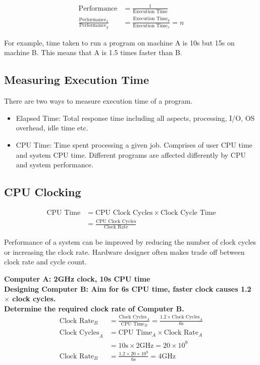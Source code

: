 \begin{align*}
    \mbox{Performance} &= \frac{1}{\mbox{Execution Time}} \\
    \frac{\mbox{Performance}_x}{\mbox{Performance}_y} &= \frac{\mbox{Execution Time}_y}{\mbox{Execution Time}_x} = n
    \label{eqn:performance}
\end{align*}

For example, time taken to run a program on machine A is 10s but 15s on machine B. This means that A is 1.5 times faster than B.

\subsection{Measuring Execution Time}
There are two ways to measure execution time of a program.
\begin{itemize}
    \item Elapsed Time: Total response time including all aspects, processing, I/O, OS overhead, idle time etc.
    \item CPU Time: Time spent processing a given job. Comprises of user CPU time and system CPU time. Different programs are affected differently by CPU and system performance.
\end{itemize}

\subsection{CPU Clocking}

\begin{align*}
    \mbox{CPU Time} &= \mbox{CPU Clock Cycles} \times \mbox{Clock Cycle Time} \\
    &= \frac{\mbox{CPU Clock Cycles}}{\mbox{Clock Rate}}   
\end{align*}

Performance of a system can be improved by reducing the number of clock cycles or increasing the clock rate. Hardware designer often makes trade off between clock rate and cycle count.

\begin{framed}
\textbf{Computer A: 2GHz clock, 10s CPU time\\Designing Computer B: Aim for 6s CPU time, faster clock causes 1.2 $\times$ clock cycles.\\Determine the required clock rate of Computer B.}
\begin{align*}
    \mbox{Clock Rate}_B &= \frac{\mbox{Clock Cycles}_A}{\mbox{CPU Time}_B} = \frac{1.2\times\mbox{Clock Cycles}_A}{6\mbox{s}} \\
    \mbox{Clock Cycles}_A &= \mbox{CPU Time}_A \times \mbox{Clock Rate}_A \\
    &= 10\mbox{s} \times 2\mbox{GHz} = 20\times10^9 \\
    \mbox{Clock Rate}_B &=  \frac{1.2\times20\times10^9}{6\mbox{s}} = \boxed{4\mbox{GHz}}
\end{align*}    
\end{framed}

